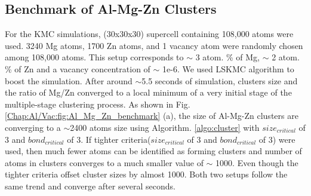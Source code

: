 \subsection{Benchmark of Al-Mg-Zn Clusters}
\label{Chap:Al/Vac:benchmark}
For the \ac{KMC} simulations, (30x30x30) supercell containing 108,000 atoms were used. 3240 Mg atoms, 1700 Zn atoms, and 1 vacancy atom were randomly chosen among 108,000 atoms. This setup corresponds to $\sim$ 3 atom. \% of Mg, $\sim$ 2 atom. \% of Zn and a vacancy concentration of $\sim$ 1e-6. We used \ac{LSKMC} algorithm to boost the simulation. After around $\sim$5.5 seconds of simulation, clusters size and the ratio of Mg/Zn converged to a local minimum of a very initial stage of the multiple-stage clustering process. As shown in Fig. \ref{Chap:Al/Vac:fig:Al_Mg_Zn_benchmark} (a), the size of Al-Mg-Zn clusters are converging to a $\sim$2400 atoms size using Algorithm. \ref{algo:cluster} with $size_{critical}$ of 3 and $bond_{critical}$ of 3. If tighter criteria($size_{critical}$ of 3 and $bond_{critical}$ of 3) were used, then much fewer atoms can be identified as forming clusters and number of atoms in clusters converges to a much smaller value of $\sim$ 1000. Even though the tighter criteria offset cluster sizes by almost 1000. Both two setups follow the same trend and converge after several seconds.

